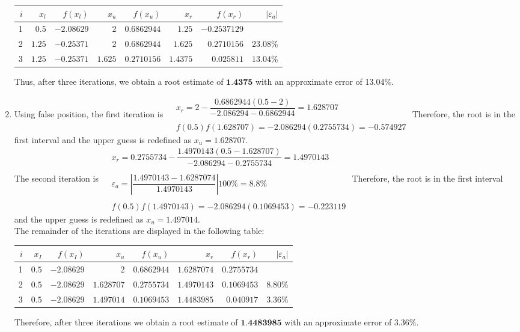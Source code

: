 \documentclass[../main.tex]{subfiles}
\begin{document}
\begin{enumerate}[label=\bfseries(\alph*)]
\begin{tabular}{|r|r|r|r|r|r|r|r|}
\hline
$i$ & $x_{l}$ & $f\left(x_{l}\right)$ & $x_{u}$ & $f\left(x_{u}\right)$ & $x_{r}$ & $f\left(x_{r}\right)$ & $\left|\varepsilon_{a}\right|$ \\
\hline
1 & $0.5$ & $-2.08629$ & 2 & $0.6862944$ & $1.25$ & $-0.2537129$ &  \\
\hline
2 & $1.25$ & $-0.25371$ & 2 & $0.6862944$ & $1.625$ & $0.2710156$ & $23.08 \%$ \\
\hline
3 & $1.25$ & $-0.25371$ & $1.625$ & $0.2710156$ & $1.4375$ & $0.025811$ & $13.04 \%$ \\
\hline
\end{tabular}
\bigbreak
Thus, after three iterations, we obtain a root estimate of $\mathbf{1 . 4 3 7 5}$ with an approximate error of 13.04\%.
\bigbreak
\item Using false position, the first iteration is
\bigbreak
$
\begin{aligned}
&x_{r}=2-\dfrac{0.6862944(0.5-2)}{-2.086294-0.6862944}=1.628707 \\\\
&f(0.5) f(1.628707)=-2.086294(0.2755734)=-0.574927
\end{aligned}
$
\bigbreak
Therefore, the root is in the first interval and the upper guess is redefined as $x_{u}=1.628707$.\\ The second iteration is
\bigbreak
$
\begin{aligned}
&x_{r}=0.2755734-\dfrac{1.4970143(0.5-1.628707)}{-2.086294-0.2755734}=1.4970143 \\\\
&\varepsilon_{a}=\left|\dfrac{1.4970143-1.6287074}{1.4970143}\right| 100 \%=8.8 \% \\
\\&f(0.5) f(1.4970143)=-2.086294(0.1069453)=-0.223119
\end{aligned}
$
\bigbreak
Therefore, the root is in the first interval and the upper guess is redefined as $x_{u}=1.497014$.\\ The remainder of the iterations are displayed in the following table:
\bigbreak
\begin{tabular}{|r|r|r|r|r|r|r|r|}
\hline
$i$ & $x_{I}$ & $f\left(x_{I}\right)$ & $x_{u}$ & $f\left(x_{u}\right)$ & $x_{r}$ & $f\left(x_{r}\right)$ & $\left|\varepsilon_{a}\right|$ \\
\hline
1 & $0.5$ & $-2.08629$ & 2 & $0.6862944$ & $1.6287074$ & $0.2755734$ &  \\
\hline
2 & $0.5$ & $-2.08629$ & $1.628707$ & $0.2755734$ & $1.4970143$ & $0.1069453$ & $8.80 \%$ \\
\hline
3 & $0.5$ & $-2.08629$ & $1.497014$ & $0.1069453$ & $1.4483985$ & $0.040917$ & $3.36 \%$ \\
\hline
\end{tabular}
\bigbreak
Therefore, after three iterations we obtain a root estimate of $\mathbf{1 . 4 4 8 3 9 8 5}$ with an approximate error of $3.36 \%$.
\bigbreak
\end{enumerate}
\end{document}

